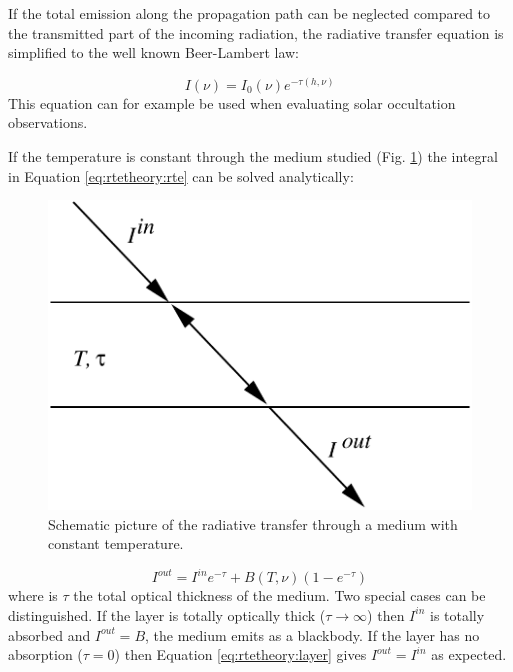  If the total emission along the propagation path can be neglected
 compared to the transmitted part of the incoming radiation, the
 radiative transfer equation is simplified to the well known Beer-Lambert law:
 
 \begin{equation}
   I(\nu) = I_0(\nu)e^{-\tau(h,\nu)}
  \label{eq:rtetheory:beer}
 \end{equation}  
 This equation can for example be used when evaluating solar
 occultation observations.  
 
 If the temperature is constant through the medium studied (Fig.
 \ref{fig:rtetheory:layer}) the integral in Equation \ref{eq:rtetheory:rte} can
 be solved analytically:

 \begin{figure}
  \begin{center}
   \begin{minipage}[c]{0.4\textwidth}
    \centering
    \caption{Schematic picture of the radiative transfer through a medium with
             constant temperature.}
    \label{fig:rtetheory:layer}
   \end{minipage}%
   \hspace{0.05\textwidth}%
   \begin{minipage}[c]{0.50\textwidth}
    \centering
    \includegraphics*[width=0.99\hsize]{fig_layer}
   \end{minipage}
  \end{center}
 \end{figure}   
  
 \begin{equation}
   I^{out} = I^{in}e^{-\tau} + B(T,\nu)(1-e^{-\tau})
  \label{eq:rtetheory:layer}
 \end{equation}  
 where is $\tau$ the total optical thickness of the medium. Two
 special cases can be distinguished. If the layer is totally optically
 thick ($\tau \to \infty$) then $I^{in}$ is totally absorbed and
 $I^{out} = B$, the medium emits as a blackbody. If the layer has no
 absorption ($\tau=0$) then Equation \ref{eq:rtetheory:layer} gives
 $I^{out} = I^{in}$ as expected.
 
